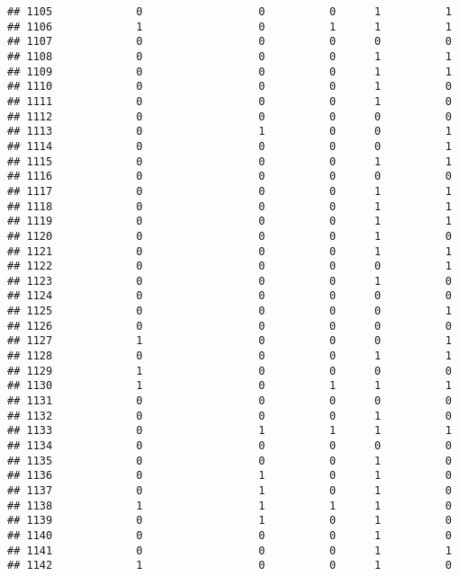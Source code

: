 \documentclass[
]{article}
\begin{document}
\begin{verbatim}
## 1105             0                  0          0      1          1
## 1106             1                  0          1      1          1
## 1107             0                  0          0      0          0
## 1108             0                  0          0      1          1
## 1109             0                  0          0      1          1
## 1110             0                  0          0      1          0
## 1111             0                  0          0      1          0
## 1112             0                  0          0      0          0
## 1113             0                  1          0      0          1
## 1114             0                  0          0      0          1
## 1115             0                  0          0      1          1
## 1116             0                  0          0      0          0
## 1117             0                  0          0      1          1
## 1118             0                  0          0      1          1
## 1119             0                  0          0      1          1
## 1120             0                  0          0      1          0
## 1121             0                  0          0      1          1
## 1122             0                  0          0      0          1
## 1123             0                  0          0      1          0
## 1124             0                  0          0      0          0
## 1125             0                  0          0      0          1
## 1126             0                  0          0      0          0
## 1127             1                  0          0      0          1
## 1128             0                  0          0      1          1
## 1129             1                  0          0      0          0
## 1130             1                  0          1      1          1
## 1131             0                  0          0      0          0
## 1132             0                  0          0      1          0
## 1133             0                  1          1      1          1
## 1134             0                  0          0      0          0
## 1135             0                  0          0      1          0
## 1136             0                  1          0      1          0
## 1137             0                  1          0      1          0
## 1138             1                  1          1      1          0
## 1139             0                  1          0      1          0
## 1140             0                  0          0      1          0
## 1141             0                  0          0      1          1
## 1142             1                  0          0      1          0

\end{verbatim}
\end{document}

